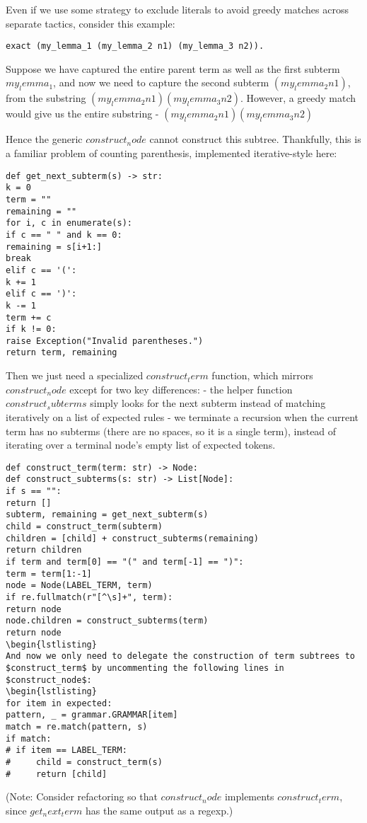 Even if we use some strategy to exclude literals to avoid greedy matches across separate tactics, consider this example:
\begin{lstlisting}
exact (my_lemma_1 (my_lemma_2 n1) (my_lemma_3 n2)).
\end{lstlisting}
Suppose we have captured the entire parent term as well as the first subterm $my_lemma_1$, and now we need to capture the second subterm $(my_lemma_2 n1)$, from the substring $(my_lemma_2 n1) (my_lemma_3 n2)$. However, a greedy match would give us the entire substring
- $(my_lemma_2 n1) (my_lemma_3 n2)$

Hence the generic $construct_node$ cannot construct this subtree. Thankfully, this is a familiar problem of counting parenthesis, implemented iterative-style here:

\begin{lstlisting}
def get_next_subterm(s) -> str:
k = 0
term = ""
remaining = ""
for i, c in enumerate(s):
if c == " " and k == 0:
remaining = s[i+1:]
break
elif c == '(':
k += 1
elif c == ')':
k -= 1
term += c
if k != 0:
raise Exception("Invalid parentheses.")
return term, remaining
\end{lstlisting}
Then we just need a specialized $construct_term$ function, which mirrors $construct_node$ except for two key differences:
- the helper function $construct_subterms$ simply looks for the next subterm instead of matching iteratively on a list of expected rules
- we terminate a recursion when the current term has no subterms (there are no spaces, so it is a single term), instead of iterating over a terminal node's empty list of expected tokens.

\begin{lstlisting}
def construct_term(term: str) -> Node:
def construct_subterms(s: str) -> List[Node]:
if s == "":
return []
subterm, remaining = get_next_subterm(s)
child = construct_term(subterm)
children = [child] + construct_subterms(remaining)
return children
if term and term[0] == "(" and term[-1] == ")":
term = term[1:-1]
node = Node(LABEL_TERM, term)
if re.fullmatch(r"[^\s]+", term):
return node
node.children = construct_subterms(term)
return node
\begin{lstlisting}
And now we only need to delegate the construction of term subtrees to $construct_term$ by uncommenting the following lines in $construct_node$:
\begin{lstlisting}
for item in expected:
pattern, _ = grammar.GRAMMAR[item]
match = re.match(pattern, s)
if match:
# if item == LABEL_TERM:
#     child = construct_term(s)
#     return [child]
\end{lstlisting}
(Note: Consider refactoring so that $construct_node$ implements $construct_term$, since $get_next_term$ has the same output as a regexp.)

